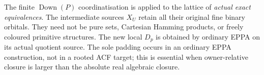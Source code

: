 \begin{remark}
The finite \(\operatorname{Down}(P)\)
coordinatisation is applied to the lattice
of \emph{actual exact equivalences}.
The intermediate sources \(X_U\) retain
all their original fine binary orbitals.
They need not be pure sets, Cartesian
Hamming products, or freely coloured
primitive structures.  The new local
\(D_p\) is obtained by ordinary EPPA
on its actual quotient source.
The sole padding occurs in an ordinary
EPPA construction, not in a rooted
ACF target; this is essential when
owner-relative closure is larger than
the absolute real algebraic closure.
\end{remark}
